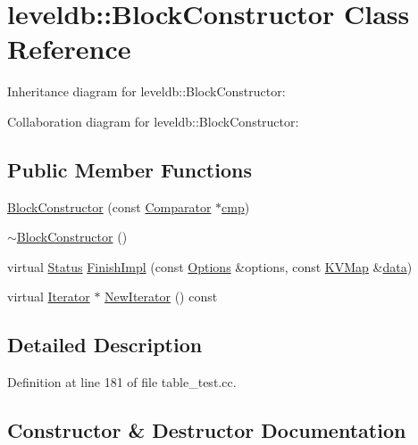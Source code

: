 \hypertarget{classleveldb_1_1_block_constructor}{}\section{leveldb\+:\+:Block\+Constructor Class Reference}
\label{classleveldb_1_1_block_constructor}


Inheritance diagram for leveldb\+:\+:Block\+Constructor\+:


Collaboration diagram for leveldb\+:\+:Block\+Constructor\+:
\subsection*{Public Member Functions}
\begin{DoxyCompactItemize}
\item 
\hyperlink{classleveldb_1_1_block_constructor_a1f89523b9e688d6525da80d5595bee4c}{Block\+Constructor} (const \hyperlink{structleveldb_1_1_comparator}{Comparator} $\ast$\hyperlink{table__test_8cc_a87863e435922f0910ca8db43f02a6c0b}{cmp})
\item 
\hyperlink{classleveldb_1_1_block_constructor_a3eb2422f0a8eebe30c95c9e1f8b04ac9}{$\sim$\+Block\+Constructor} ()
\item 
virtual \hyperlink{classleveldb_1_1_status}{Status} \hyperlink{classleveldb_1_1_block_constructor_ae3f38f0769d34cb7d80776b8249f48ae}{Finish\+Impl} (const \hyperlink{structleveldb_1_1_options}{Options} \&options, const \hyperlink{namespaceleveldb_aac1e50450147be263e08252c6700f7a7}{K\+V\+Map} \&\hyperlink{classleveldb_1_1_constructor_a55a0363200d6e86d8beb3b15b75e3824}{data})
\item 
virtual \hyperlink{classleveldb_1_1_iterator}{Iterator} $\ast$ \hyperlink{classleveldb_1_1_block_constructor_a94b568e7f3aa7ad26eda141c3b4297ca}{New\+Iterator} () const 
\end{DoxyCompactItemize}


\subsection{Detailed Description}


Definition at line 181 of file table\+\_\+test.\+cc.



\subsection{Constructor \& Destructor Documentation}
\hypertarget{classleveldb_1_1_block_constructor_a1f89523b9e688d6525da80d5595bee4c}{}
